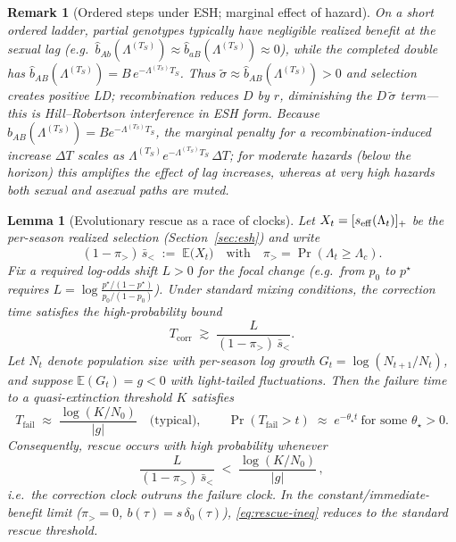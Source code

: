 \documentclass[11pt]{article}
\theoremstyle{upright}
\newtheorem{lemma}{Lemma}
\newtheorem{remark}{Remark}
\newcommand{\seff}[1][]{s_{\mathrm{eff}\if\relax\detokenize{#1}\relax\else,#1\fi}}
\begin{document}
\begin{remark}[Ordered steps under ESH; marginal effect of hazard]
On a short ordered ladder, partial genotypes typically have negligible realized benefit at the sexual lag (e.g.\ $\widehat b_{Ab}(\Lambda^{(T_S)})\approx \widehat b_{aB}(\Lambda^{(T_S)})\approx 0$),
while the completed double has $\widehat b_{AB}(\Lambda^{(T_S)})=B\,e^{-\Lambda^{(T_S)}T_S}$.
Thus $\tilde\sigma\approx \widehat b_{AB}(\Lambda^{(T_S)})>0$ and selection \emph{creates} positive LD; recombination reduces $D$ by $r$, diminishing the $D\,\tilde\sigma$ term—this is Hill--Robertson interference in ESH form.
Because $\widehat b_{AB}(\Lambda^{(T_S)})=B e^{-\Lambda^{(T_S)}T_S}$, the \emph{marginal} penalty for a recombination-induced increase $\Delta T$ scales as $\Lambda^{(T_S)} e^{-\Lambda^{(T_S)}T_S}\,\Delta T$; for moderate hazards (below the horizon) this amplifies the effect of lag increases, whereas at very high hazards both sexual and asexual paths are muted.
\end{remark}

\begin{lemma}[Evolutionary rescue as a race of clocks]\label{lem:rescue}
Let $X_t=[\seff(\Lambda_t)]_+$ be the per-season realized selection (Section~\ref{sec:esh}) and write
\[
(1-\pi_{>})\,\bar s_{<} \;:=\; \mathbb E\!\big(X_t\big) \quad\text{with}\quad \pi_{>}=\Pr(\Lambda_t\ge \Lambda_c).
\]
Fix a required log-odds shift $L>0$ for the focal change (e.g.\ from $p_0$ to $p^\star$ requires $L=\log\!\frac{p^\star/(1-p^\star)}{p_0/(1-p_0)}$). Under standard mixing conditions,
the \emph{correction time} satisfies the high-probability bound
\[
T_{\mathrm{corr}} \;\gtrsim\; \frac{L}{(1-\pi_{>})\,\bar s_{<}}.
\]
Let $N_t$ denote population size with per-season log growth $G_t=\log(N_{t+1}/N_t)$, and suppose $\mathbb E(G_t)=g<0$ with light-tailed fluctuations. Then the \emph{failure time} to a quasi-extinction threshold $K$ satisfies
\[
T_{\mathrm{fail}} \;\approx\; \frac{\log(K/N_0)}{|g|} \quad\text{(typical)},\qquad
\Pr(T_{\mathrm{fail}}>t)\;\approx\; e^{-\theta_\star t}\ \text{for some }\theta_\star>0.
\]
Consequently, \emph{rescue occurs with high probability} whenever
\begin{equation}\label{eq:rescue-ineq}
\frac{L}{(1-\pi_{>})\,\bar s_{<}} \;<\; \frac{\log(K/N_0)}{|g|}\,,
\end{equation}
i.e.\ the correction clock outruns the failure clock. In the constant/immediate-benefit limit ($\pi_{>}=0$, $b(\tau)=s\,\delta_0(\tau)$), \eqref{eq:rescue-ineq} reduces to the standard rescue threshold.
\end{lemma}
\end{document}
